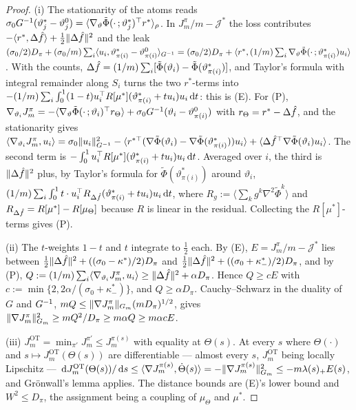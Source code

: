 \begin{proof}
(i) The stationarity of the atoms reads
$\sigma_0G^{-1}(\vartheta^*_j - \vartheta^0_j) = \langle\nabla_\vartheta\tilde\Phi(\cdot\,;\vartheta^*_j)^\top r^*\rangle_\rho$.
In $J^\pi_m/m - \mathcal{J}^*$ the loss contributes $-\langle r^*,\Delta\hat f\rangle + \frac12\lVert \Delta\hat f\rVert^2$
and the leak
$(\sigma_0/2)D_\pi + (\sigma_0/m)\sum_i\langle u_i,\vartheta^*_{\pi(i)} - \vartheta^0_{\pi(i)}\rangle_{G^{-1}}
= (\sigma_0/2)D_\pi + \langle r^*,(1/m)\sum_i\nabla_\vartheta\tilde\Phi(\cdot\,;\vartheta^*_{\pi(i)})u_i\rangle$.
With the counts, $\Delta\hat f = (1/m)\sum_i[\tilde\Phi(\vartheta_i) - \tilde\Phi(\vartheta^*_{\pi(i)})]$, and Taylor's
formula with integral remainder along $S_i$ turns the two $r^*$-terms into
$-(1/m)\sum_i\int_0^1(1 - t)u_i^\top R[\mu^*](\vartheta^*_{\pi(i)} + tu_i)u_i\,\mathrm{d} t$: this is (E). For (P),
$\nabla_{\vartheta_i}J^\pi_m = -\langle\nabla_\vartheta\tilde\Phi(\cdot\,;\vartheta_i)^\top r_\Theta\rangle
+ \sigma_0G^{-1}(\vartheta_i - \vartheta^0_{\pi(i)})$ with $r_\Theta = r^* - \Delta\hat f$, and the stationarity gives
$\langle\nabla_{\vartheta_i}J^\pi_m,u_i\rangle = \sigma_0\lVert u_i\rVert^2_{G^{-1}}
- \langle r^{*\top}(\nabla\tilde\Phi(\vartheta_i) - \nabla\tilde\Phi(\vartheta^*_{\pi(i)}))u_i\rangle
+ \langle\Delta\hat f^\top\nabla\tilde\Phi(\vartheta_i)u_i\rangle$. The second term is
$-\int_0^1u_i^\top R[\mu^*](\vartheta^*_{\pi(i)} + tu_i)u_i\,\mathrm{d} t$. Averaged over $i$, the third is
$\lVert \Delta\hat f\rVert^2$ plus, by Taylor's formula for $\tilde\Phi(\vartheta^*_{\pi(i)})$ around $\vartheta_i$,
$(1/m)\sum_i\int_0^1t\cdot u_i^\top R_{\Delta\hat f}(\vartheta^*_{\pi(i)} + tu_i)u_i\,\mathrm{d} t$, where
$R_g := \langle\sum_kg^k\nabla^2\tilde\Phi^k\rangle$ and $R_{\Delta\hat f} = R[\mu^*] - R[\mu_\Theta]$ because $R$ is
linear in the residual. Collecting the $R[\mu^*]$-terms gives (P).

(ii) The $t$-weights $1 - t$ and $t$ integrate to $\frac12$ each. By (E), $E = J^\pi_m/m - \mathcal{J}^*$ lies
between $\frac12\lVert \Delta\hat f\rVert^2 + ((\sigma_0 - \kappa^*)/2)D_\pi$ and
$\frac12\lVert \Delta\hat f\rVert^2 + ((\sigma_0 + \kappa^*_-)/2)D_\pi$, and by (P),
$Q := (1/m)\sum_i\langle\nabla_{\vartheta_i}J^\pi_m,u_i\rangle\ge\lVert \Delta\hat f\rVert^2 + \alpha D_\pi$. Hence
$Q\ge cE$ with $c := \min\{2, 2\alpha/(\sigma_0 + \kappa^*_-)\}$, and $Q\ge\alpha D_\pi$. Cauchy--Schwarz in the
duality of $G$ and $G^{-1}$, $mQ\le\lVert \nabla J^\pi_m\rVert_{G_m}(mD_\pi)^{1/2}$, gives
$\lVert \nabla J^\pi_m\rVert^2_{G_m}\ge mQ^2/D_\pi\ge m\alpha Q\ge m\alpha cE$.

(iii) $J_m^{\mathrm{OT}} = \min_{\pi'}J^{\pi'}_m\le J^{\pi(s)}_m$ with equality at $\Theta(s)$. At every $s$ where
$\Theta(\cdot)$ and $s\mapsto J_m^{\mathrm{OT}}(\Theta(s))$ are differentiable --- almost every $s$,
$J_m^{\mathrm{OT}}$ being locally Lipschitz ---
$\,\mathrm{d} J_m^{\mathrm{OT}}(\Theta(s))/\,\mathrm{d} s\le\langle\nabla J^{\pi(s)}_m,\dot\Theta(s)\rangle
= -\lVert \nabla J^{\pi(s)}_m\rVert^2_{G_m}\le-m\lambda(s)_+E(s)$, and Gr\"onwall's lemma applies. The distance bounds
are (E)'s lower bound and $W^2\le D_\pi$, the assignment being a coupling of $\mu_\Theta$ and $\mu^*$.


\end{proof}
